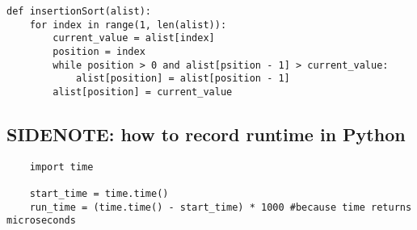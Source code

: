 \documentclass[a4paper]{article}
\begin{document}
\begin{lstlisting}
def insertionSort(alist):
    for index in range(1, len(alist)):
        current_value = alist[index]
        position = index
        while position > 0 and alist[psition - 1] > current_value:
            alist[position] = alist[position - 1]
        alist[position] = current_value
\end{lstlisting}

\subsection{SIDENOTE: how to record runtime in Python}
\begin{lstlisting}
    import time

    start_time = time.time()
    run_time = (time.time() - start_time) * 1000 #because time returns microseconds
\end{lstlisting}
\end{document}
